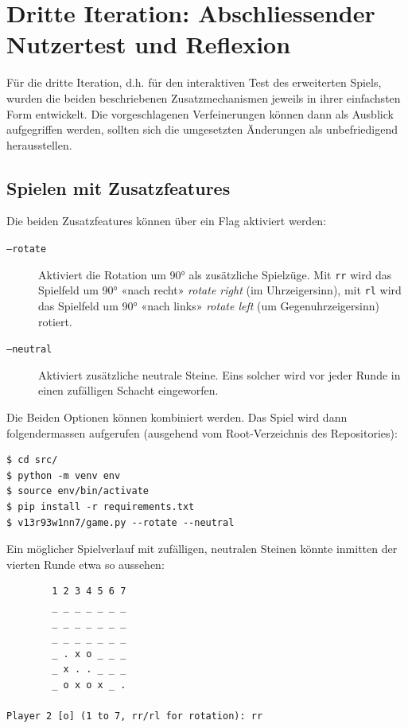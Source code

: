 \documentclass[a4paper,11pt,hidelinks]{scrartcl}
\begin{document}
\clearpage

\section{Dritte Iteration: Abschliessender Nutzertest und Reflexion}

Für die dritte Iteration, d.h. für den interaktiven Test des erweiterten Spiels, wurden die beiden beschriebenen Zusatzmechanismen jeweils in ihrer einfachsten Form entwickelt. Die vorgeschlagenen Verfeinerungen können dann als Ausblick aufgegriffen werden, sollten sich die umgesetzten Änderungen als unbefriedigend herausstellen.

\subsection{Spielen mit Zusatzfeatures}

Die beiden Zusatzfeatures können über ein Flag aktiviert werden:

\begin{description}
    \item[\texttt{--rotate}] Aktiviert die Rotation um 90° als zusätzliche Spielzüge. Mit \texttt{rr} wird das Spielfeld um 90° «nach recht» \textit{rotate right} (im Uhrzeigersinn), mit \texttt{rl} wird das Spielfeld um 90° «nach links» \textit{rotate left} (um Gegenuhrzeigersinn) rotiert.
    \item[\texttt{--neutral}] Aktiviert zusätzliche neutrale Steine. Eins solcher wird vor jeder Runde in einen zufälligen Schacht eingeworfen.
\end{description}

Die Beiden Optionen können kombiniert werden. Das Spiel wird dann folgendermassen aufgerufen (ausgehend vom Root-Verzeichnis des Repositories):

\begin{lstlisting}
$ cd src/
$ python -m venv env
$ source env/bin/activate
$ pip install -r requirements.txt
$ v13r93w1nn7/game.py --rotate --neutral
\end{lstlisting}

Ein möglicher Spielverlauf mit zufälligen, neutralen Steinen könnte inmitten der vierten Runde etwa so aussehen:

\begin{lstlisting}
        1 2 3 4 5 6 7
        _ _ _ _ _ _ _
        _ _ _ _ _ _ _
        _ _ _ _ _ _ _
        _ . x o _ _ _
        _ x . . _ _ _
        _ o x o x _ .

Player 2 [o] (1 to 7, rr/rl for rotation): rr
\end{lstlisting}
\end{document}

